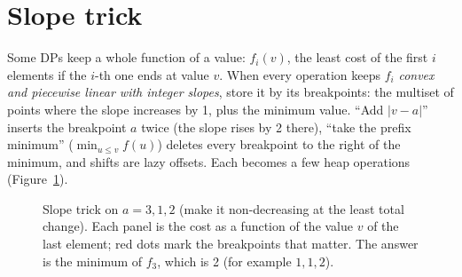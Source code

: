 \section[Slope trick]{Slope trick \hfill \ioi}\label{sec:slopetrick}

Some DPs keep a whole function of a value: $f_i(v)$, the least cost of the first $i$ elements if the $i$-th one ends at value $v$. When
every operation keeps $f_i$ \emph{convex and piecewise linear with integer slopes}, store it by its breakpoints: the multiset of points
where the slope increases by 1, plus the minimum value. ``Add $|v - a|$'' inserts the breakpoint $a$ twice (the slope rises by 2
there), ``take the prefix minimum'' ($\min_{u \le v} f(u)$) deletes every breakpoint to the right of the minimum, and shifts are
lazy offsets. Each becomes a few heap operations (Figure~\ref{fig:slopetrick}).

\begin{figure}[htbp]
\centering
{}
\caption{Slope trick on $a = 3, 1, 2$ (make it non-decreasing at the least total change). Each panel is the cost as a function of
the value $v$ of the last element; red dots mark the breakpoints that matter. The answer is the minimum of $f_3$, which is 2 (for
example $1, 1, 2$).}
\label{fig:slopetrick}
\end{figure}


